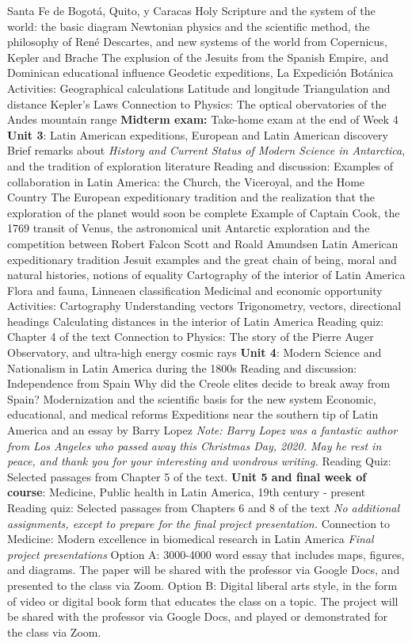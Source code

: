 \documentclass[10pt]{article}
\begin{document}
\begin{outline}[enumerate]
\3 Santa Fe de Bogot\'{a}, Quito, y Caracas
\3 Holy Scripture and the system of the world: the basic diagram
\3 Newtonian physics and the scientific method, the philosophy of Ren\'{e} Descartes, and new systems of the world from Copernicus, Kepler and Brache
\3 The explusion of the Jesuits from the Spanish Empire, and Dominican educational influence
\3 Geodetic expeditions, La Expedici\'{o}n Bot\'{a}nica
\2 Activities: Geographical calculations
\3 Latitude and longitude
\3 Triangulation and distance
\3 Kepler's Laws
\2 Connection to Physics: The optical obervatories of the Andes mountain range
\1 \textbf{Midterm exam:} Take-home exam at the end of Week 4
\1 \textbf{Unit 3}: Latin American expeditions, European and Latin American discovery
\2 Brief remarks about \textit{History and Current Status of Modern Science in Antarctica}, and the tradition of exploration literature
\2 Reading and discussion: Examples of collaboration in Latin America: the Church, the Viceroyal, and the Home Country
\3 The European expeditionary tradition and the realization that the exploration of the planet would soon be complete
\4 Example of Captain Cook, the 1769 transit of Venus, the astronomical unit
\4 Antarctic exploration and the competition between Robert Falcon Scott and Roald Amundsen
\3 Latin American expeditionary tradition
\4 Jesuit examples and the great chain of being, moral and natural histories, notions of equality
\4 Cartography of the interior of Latin America
\4 Flora and fauna, Linneaen classification
\4 Medicinal and economic opportunity
\2 Activities: Cartography
\3 Understanding vectors
\3 Trigonometry, vectors, directional headings
\3 Calculating distances in the interior of Latin America
\2 Reading quiz: Chapter 4 of the text
\2 Connection to Physics: The story of the Pierre Auger Observatory, and ultra-high energy cosmic rays
\1 \textbf{Unit 4}: Modern Science and Nationalism in Latin America during the 1800s
\2 Reading and discussion: Independence from Spain
\3 Why did the Creole elites decide to break away from Spain?
\3 Modernization and the scientific basis for the new system
\3 Economic, educational, and medical reforms
\2 Expeditions near the southern tip of Latin America and an essay by Barry Lopez
\3 \textit{Note: Barry Lopez was a fantastic author from Los Angeles who passed away this Christmas Day, 2020.  May he rest in peace, and thank you for your interesting and wondrous writing.}
\2 Reading Quiz: Selected passages from Chapter 5 of the text.
\1 \textbf{Unit 5 and final week of course}: Medicine, Public health in Latin America, 19th century - present
\2 Reading quiz: Selected passages from Chapters 6 and 8 of the text
\2 \textit{No additional assignments, except to prepare for the final project presentation.}
\2 Connection to Medicine: Modern excellence in biomedical research in Latin America
\2 \textit{Final project presentations}
\3 Option A: 3000-4000 word essay that includes maps, figures, and diagrams. The paper will be shared with the professor via Google Docs, and presented to the class via Zoom.
\3 Option B: Digital liberal arts style, in the form of video or digital book form that educates the class on a topic.  The project will be shared with the professor via Google Docs, and played or demonstrated for the class via Zoom.
\end{outline}
\end{document}
